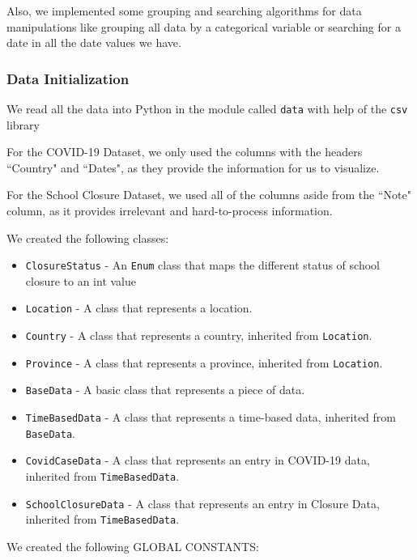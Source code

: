 \documentclass[fontsize=11pt]{article}
\begin{document}
    Also, we implemented some grouping and searching algorithms for data manipulations like grouping all data by a categorical variable or searching for a date in all the date values we have.

    \subsubsection{Data Initialization}

    We read all the data into Python in the module called \verb|data| with help of the \verb|csv| library 

    For the COVID-19 Dataset, we only used the columns with the headers ``Country" and ``Dates", as they provide the information for us to visualize.

    For the School Closure Dataset, we used all of the columns aside from the ``Note" column, as it provides irrelevant and hard-to-process information.

    We created the following classes:

    \begin{itemize}
        \item \verb|ClosureStatus| - An \verb|Enum| class that maps the different status of school closure to an int value
        \item \verb|Location| - A class that represents a location.
        \item \verb|Country| - A class that represents a country, inherited from \verb|Location|.
        \item \verb|Province| - A class that represents a province, inherited from \verb|Location|.
        \item \verb|BaseData| - A basic class that represents a piece of data.
        \item \verb|TimeBasedData| - A class that represents a time-based data, inherited from \verb|BaseData|.
        \item \verb|CovidCaseData| - A class that represents an entry in COVID-19 data, inherited from \verb|TimeBasedData|.
        \item \verb|SchoolClosureData| - A class that represents an entry in Closure Data, inherited from \verb|TimeBasedData|.
    \end{itemize}

    We created the following GLOBAL CONSTANTS:
\end{document}
